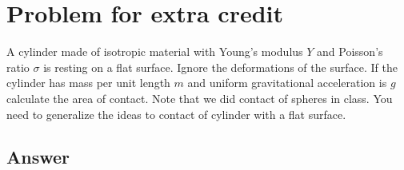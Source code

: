 \documentclass{article}
\begin{document}
\section*{Problem for extra credit}
A cylinder made of isotropic material with Young's modulus $Y$ and Poisson's ratio $\sigma$ is resting on a flat surface. Ignore the deformations of the surface.
If the cylinder has mass per unit length $m$ and uniform gravitational acceleration is $g$ calculate the area of contact. Note that we did contact of spheres in class. You need to generalize the ideas to contact of cylinder with a flat surface.

\subsection*{Answer}
\end{document}
